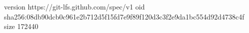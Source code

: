 version https://git-lfs.github.com/spec/v1
oid sha256:08db90dcb0c961e2b712d5f15fd7e9f89f120d3c3f2e9da1bc554d92d4738c4f
size 172440
